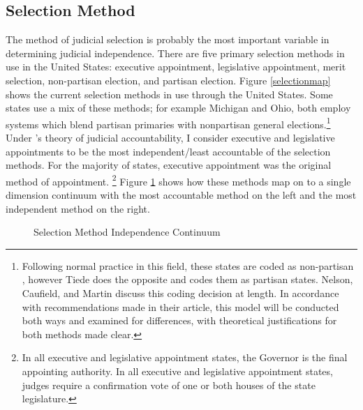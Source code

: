 \documentclass[12pt]{article}
\begin{document}
\subsection*{Selection Method}
The method of judicial selection is probably the most important variable in determining judicial independence. There are five primary selection methods in use in the United States: executive appointment, legislative appointment, merit selection, non-partisan election, and partisan election. Figure \ref{selectionmap} shows the current selection methods in use through the United States.  Some states use a mix of these methods; for example Michigan and Ohio, both employ systems which blend partisan primaries with nonpartisan general elections.\footnote{Following normal practice in this field, these states are coded as non-partisan \citep{Canes-Wrone2012, Caldarone2009}, however Tiede \citeyearpar{Tiede2006} does the opposite and codes them as partisan states. Nelson, Caufield, and Martin \citeyearpar{Nelson2013} discuss this coding decision at length.  In accordance with recommendations made in their article, this model will be conducted both ways and examined for differences, with theoretical justifications for both methods made clear.}    Under \citet{Hall2007}'s theory of judicial accountability, I consider executive and legislative appointments to be the most independent/least accountable of the selection methods.  For the majority of states, executive appointment was the original method of appointment.  \footnote{In all executive and legislative appointment states, the Governor is the final appointing authority.  In all executive and legislative appointment states, judges require a confirmation vote of one or both houses of the state legislature.}  Figure \ref{selectioncontinuum} shows how these methods map on to a single dimension continuum with the most accountable method on the left and the most independent method on the right. 

\begin{figure}[tbh]\centering\caption{Selection Method Independence Continuum}\label{selectioncontinuum}
\end{figure} 
\end{document}
